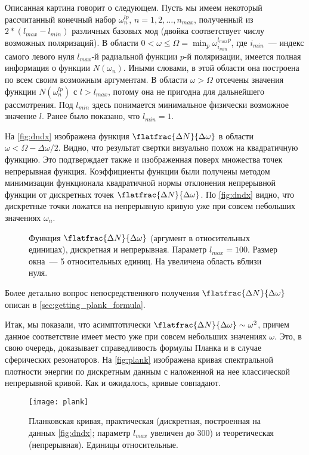     Описанная картина говорит о следующем. Пусть мы имеем некоторый рассчитанный конечный набор $\omega^{lp}_n$, $n = 1, 2, \dots, n_{max}$, полученный из $2 * (l_{max} - l_{min})$ различных базовых мод (двойка соответствует числу возможных поляризаций). В области $0 < \omega \le \Omega = \min_p{\omega^{l_{max}p}_{i_{min}}}$, где $i_{min}$~--- индекс самого левого нуля $l_{max}$-й радиальной функции $p$-й поляризации, имеется полная информация о функции $N(\omega_n)$. Иными словами, в этой области она построена по всем своим возможным аргументам. В области $\omega > \Omega$ отсечены значения функции $N(\omega^{lp}_n)$ с $l > l_{max}$, потому она не пригодна для дальнейшего рассмотрения. Под $l_{min}$ здесь понимается минимальное физически возможное значение $l$. Ранее было показано, что $l_{min} = 1$.

    На \autoref{fig:dndx} изображена функция $\flatfrac{\Delta N}{\Delta \omega}$ в области $\omega < \Omega - \Delta\omega / 2$. Видно, что результат свертки визуально похож на квадратичную функцию. Это подтверждает также и изображенная поверх множества точек непрерывная функция. Коэффициенты функции были получены методом минимизации функционала квадратичной нормы отклонения непрерывной функции от дискретных точек $\flatfrac{\Delta N}{\Delta \omega}$. По \autoref{fig:dndx} видно, что дискретные точки ложатся на непрерывную кривую уже при совсем небольших значениях $\omega_n$.
    \begin{figure}[h]
        \centering
        \hspace{8pt}%
        \hspace{8pt}%
        \caption[]{Функция $\flatfrac{\Delta N}{\Delta \omega}$ (аргумент в относительных единицах), дискретная и непрерывная. Параметр $l_{max} = 100$. Размер окна~--- 5 относительных единиц. На  увеличена область вблизи нуля. %
        } %
        \label{fig:dndx}%
    \end{figure}

    Более детально вопрос непосредственного получения $\flatfrac{\Delta N}{\Delta \omega}$ описан в \autoref{sec:getting_plank_formula}.

    Итак, мы показали, что асимптотически $\flatfrac{\Delta N}{\Delta \omega} \sim \omega^2$, причем данное соответствие имеет место уже при совсем небольших значениях $\omega$. Это, в свою очередь, доказывает справедливость формулы Планка и в случае сферических резонаторов. На \autoref{fig:plank} изображена кривая спектральной плотности энергии по дискретным данным с наложенной на нее классической непрерывной кривой. Как и ожидалось, кривые совпадают.
    \begin{figure}[h]
        \centering
        \texttt{[image: plank]}
        \caption[]{Планковская кривая, практическая (дискретная, построенная на данных \autoref{fig:dndx}; параметр $l_{max}$ увеличен до $300$) и теоретическая (непрерывная). Единицы относительные.}
        \label{fig:plank}
    \end{figure}
